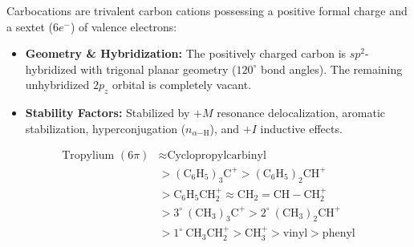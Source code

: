 \documentclass[10pt,twoside,openright]{book}
\begin{document}
\begin{conceptbox}
Carbocations are trivalent carbon cations possessing a positive formal charge and a sextet ($6e^-$) of valence electrons:
\begin{itemize}
  \item \textbf{Geometry \& Hybridization:} The positively charged carbon is $sp^2$-hybridized with trigonal planar geometry ($120^\circ$ bond angles). The remaining unhybridized $2p_z$ orbital is completely vacant.
  \item \textbf{Stability Factors:} Stabilized by $+M$ resonance delocalization, aromatic stabilization, hyperconjugation ($n_{\alpha\mathrm{-H}}$), and $+I$ inductive effects.
\end{itemize}
\begin{align}
  \text{Tropylium } (6\pi) &\approx \text{Cyclopropylcarbinyl} \\
  &> \mathrm{(C_6H_5)_3C^+} > \mathrm{(C_6H_5)_2CH^+} \\
  &> \mathrm{C_6H_5CH_2^+} \approx \mathrm{CH_2=CH-CH_2^+} \\
  &> 3^\circ \ \mathrm{(CH_3)_3C^+} > 2^\circ \ \mathrm{(CH_3)_2CH^+} \\
  &> 1^\circ \ \mathrm{CH_3CH_2^+} > \mathrm{CH_3^+} > \mathrm{vinyl} > \mathrm{phenyl}
\end{align}
\end{conceptbox}
\end{document}
